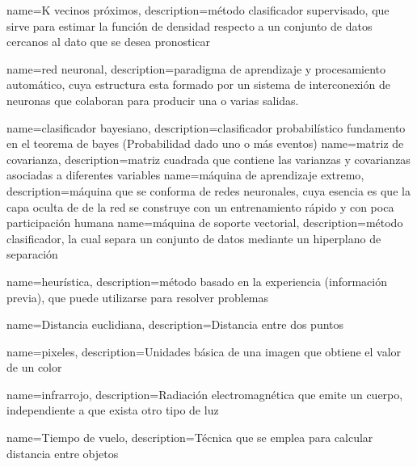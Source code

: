  {
 name={K vecinos pr\'oximos},
 description={m\'etodo clasificador supervisado, que sirve para estimar la funci\'on de densidad respecto a un conjunto de datos cercanos al dato que se desea pronosticar}
 } 
 
 {
 name={red neuronal},
 description={paradigma de aprendizaje y procesamiento autom\'atico, cuya estructura esta formado por un sistema de interconexi\'on de neuronas que colaboran para producir una o varias salidas.}
 }
 
 {
 name={clasificador bayesiano},
 description={clasificador probabil\'istico fundamento en el teorema de bayes (Probabilidad dado uno o m\'as eventos)}
 }
 {
 name={matriz de covarianza},
 description={matriz cuadrada que contiene las varianzas y covarianzas asociadas a diferentes variables}
 } 
 {
 name={m\'aquina de aprendizaje extremo},
 description={m\'aquina que se conforma de redes neuronales, cuya esencia es que la capa oculta de de la red se construye con un entrenamiento r\'apido y con poca participaci\'on humana}
 }  
 {
 name={m\'aquina de soporte vectorial},
 description={m\'etodo clasificador, la cual separa un conjunto de datos mediante un hiperplano de separaci\'on}
 }
 
 {
 name={heur\'istica},
 description={m\'etodo basado en la experiencia (informaci\'on previa), que puede utilizarse para resolver problemas }
 }


 
 {	
 name={Distancia euclidiana},
 description={Distancia entre dos puntos}
 }
 
 
 {
 name={pixeles},
 description={Unidades b\'asica de una imagen que obtiene el valor de un color}
 }
 
 {
 name={infrarrojo},
 description={Radiaci\'on electromagn\'etica que emite un cuerpo, independiente a que exista otro tipo de luz}
 }
 
 {
 name={Tiempo de vuelo},
 description={T\'ecnica que se emplea para calcular distancia entre objetos}
 }